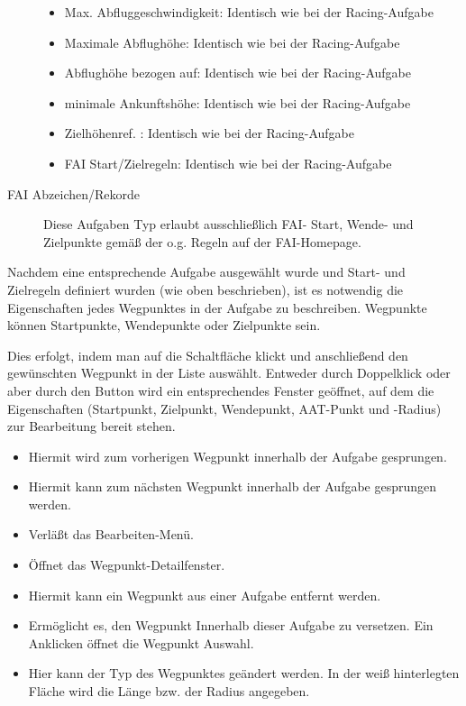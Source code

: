\begin{description}
\begin{itemize}
        	\item Max. Abfluggeschwindigkeit: Identisch wie bei der Racing-Aufgabe
        	\item Maximale Abflughöhe: Identisch wie bei der Racing-Aufgabe
        	\item Abflughöhe bezogen auf: Identisch wie bei der Racing-Aufgabe
        	\item minimale Ankunftshöhe: Identisch wie bei der Racing-Aufgabe
        	\item Zielhöhenref. : Identisch wie bei der Racing-Aufgabe
        	\item FAI Start/Zielregeln: Identisch wie bei der Racing-Aufgabe
    \end{itemize}
\item[FAI Abzeichen/Rekorde] Diese Aufgaben Typ erlaubt ausschließlich FAI- Start, Wende- und Zielpunkte gemäß der o.g. Regeln auf der FAI-Homepage.
\end{description}

Nachdem eine entsprechende Aufgabe ausgewählt wurde und Start- und Zielregeln definiert wurden (wie oben beschrieben), ist es notwendig die Eigenschaften jedes Wegpunktes in der Aufgabe zu beschreiben. Wegpunkte können Startpunkte, Wendepunkte oder Zielpunkte sein.

Dies erfolgt, indem man auf die  Schaltfläche klickt und anschließend den gewünschten Wegpunkt in der Liste auswählt. Entweder durch Doppelklick oder aber durch den Button  wird ein entsprechendes Fenster geöffnet, auf dem die Eigenschaften (Startpunkt, Zielpunkt, Wendepunkt, AAT-Punkt und -Radius) zur Bearbeitung bereit stehen.

\begin{itemize}
\item {} Hiermit wird zum vorherigen Wegpunkt innerhalb der Aufgabe gesprungen.
\item {} Hiermit kann zum nächsten Wegpunkt innerhalb der Aufgabe gesprungen werden.
\item {} Verläßt das Bearbeiten-Menü.
\item {} Öffnet das Wegpunkt-Detailfenster.
\item {} Hiermit kann ein Wegpunkt aus einer Aufgabe entfernt werden.
\item {} Ermöglicht es, den Wegpunkt Innerhalb dieser Aufgabe zu versetzen. Ein Anklicken öffnet die Wegpunkt Auswahl.
\item {}  Hier kann der Typ des Wegpunktes geändert werden. In der weiß hinterlegten Fläche wird die Länge bzw. der Radius angegeben.
\end{itemize}

